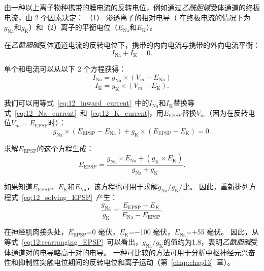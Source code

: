 \begin{proposition}[终板电位的反转电位] \label{box:12_1}
	
	\quad \quad 由一种以上离子物种携带的膜电流的反转电位，例如通过\textit{乙酰胆碱}受体通道的终板电流，由 2 个因素决定：
	（1） 渗透离子的相对电导（ 在终板电流的情况下为$g_\text{Na}$和$g_\text{K}$）和（2）离子的平衡电位（$E_\text{Na}$和$E_\text{K}$）。
	
	\quad \quad 在\textit{乙酰胆碱}受体通道电流的反转电位下，携带的内向电流与携带的外向电流平衡：
	\begin{equation}\label{eq:12_inward_current}
		I_\text{Na} + I_\text{K} = 0.
	\end{equation}
	
	\quad \quad 单个和电流可以从以下 2 个方程获得：
	\begin{equation}\label{eq:12_Na_current}
		I_\text{Na} = g_\text{Na} \times (V_m - E_\text{Na})
	\end{equation}
	\begin{equation}\label{eq:12_K_current}
		I_\text{K} = g_\text{K} \times (V_m - E_\text{K}).
	\end{equation}
	
	\quad \quad 我们可以用等式~\ref{eq:12_inward_current}~中的$ I_\text{Na} $和$ I_\text{K} $替换等式~\ref{eq:12_Na_current}~和~\ref{eq:12_K_current}，用$E_{\text{EPSP}}$替换$V_m$（因为在反转电位$V_m = E_{\text{EPSP}}$时）：
	\begin{equation}\label{eq:12_substitude_inward_current}
		g_\text{Na} \times (E_{\text{EPSP}} - E_\text{Na}) + 
		g_\text{K} \times (E_{\text{EPSP}} - E_\text{K})
		= 0.
	\end{equation}
	
	\quad \quad 求解$ E_{\text{EPSP}} $的这个方程生成：
	\begin{equation}\label{eq:12_solving_EPSP}
		E_{\text{EPSP}} = 
			\frac{
				g_\text{Na} \times E_\text{Na} + (g_\text{K} \times E_\text{K})
			}
			{
				g_\text{Na} + g_\text{K}
			}.
	\end{equation}
	
	\quad \quad 如果知道$E_{\text{EPSP}}$、$E_\text{K}$和$E_\text{Na}$，该方程也可用于求解$g_\text{Na} / g_\text{K}$/比。
	因此，重新排列方程式~\ref{eq:12_solving_EPSP}~产生：
	\begin{equation}\label{eq:12:rearranging_EPSP}
		\frac{g_\text{Na}}{g_\text{K}} = 
		\frac{E_{\text{EPSP}} - E_{K}}{E_\text{Na} - E_{\text{EPSP}}}.
	\end{equation}
	
	\quad \quad 在神经肌肉接头处，$E_{\text{EPSP}}$=0 毫伏，$E_\text{K}$=−100 毫伏，$E_\text{Na}$=+55 毫伏。
	因此，从等式~\ref{eq:12:rearranging_EPSP}~可以看出，$g_\text{Na} / g_\text{K}$的值约为1.8，表明\textit{乙酰胆碱}受体通道对的电导略高于对的电导。
	一种可比较的方法可用于分析中枢神经元兴奋性和抑制性突触电位期间的反转电位和离子运动（第~\ref{chap:chap13}~章）。
	
\end{proposition}



